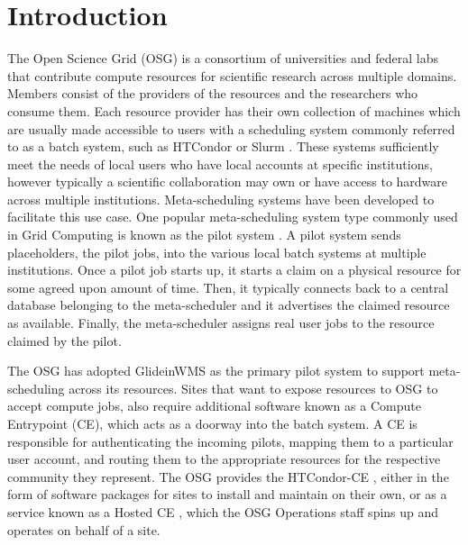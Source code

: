 \documentclass[manuscript,screen,review]{acmart}
\begin{document}

\maketitle

\section{Introduction}
\label{intro}
The Open Science Grid (OSG) \cite{OSG} is a consortium of universities and federal labs that contribute compute resources for scientific research across multiple domains. Members consist of the providers of the resources and the researchers who consume them. Each resource provider has their own collection of machines which are usually made accessible to users with a scheduling system commonly referred to as a batch system, such as HTCondor \cite{HTCondorURL} or Slurm \cite{SlurmURL}. %
These systems sufficiently meet the needs of local users who have local accounts at specific institutions, however typically a scientific collaboration may own or have access to hardware across multiple institutions. Meta-scheduling systems have been developed to facilitate this use case. One popular meta-scheduling system type commonly used in Grid Computing is known as the pilot system \cite{GlideinWMS}. A pilot system sends placeholders, the pilot jobs, into the various local batch systems at multiple institutions. Once a pilot job starts up, it starts a claim on a physical resource for some agreed upon amount of time.
Then, it typically connects back to a central database belonging to the meta-scheduler and it advertises the claimed resource as available. Finally, the meta-scheduler assigns real user jobs to the resource claimed by the pilot. 

The OSG has adopted GlideinWMS \cite{GlideinWMSSoft} as the primary pilot system to support meta-scheduling across its resources. Sites that want to expose resources to OSG to accept compute jobs, also require additional software known as a Compute Entrypoint (CE), which acts as a doorway into the batch system. A CE is responsible for authenticating the incoming pilots, mapping them to a particular user account, and routing them to the appropriate resources for the respective community they represent. The OSG provides the HTCondor-CE \cite{HTCondor-CE}, %
either in the form of software packages for sites to install and maintain on their own, or as a service known as a Hosted CE \cite{HostedCE}, %
which the OSG Operations staff spins up and operates on behalf of a site.
\end{document}
